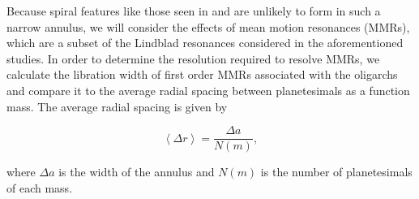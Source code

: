 Because spiral features like those seen in \cite{weinberg07a, weinberg07b} and \cite{cionco02} are unlikely to form in such a 
narrow annulus, we will consider the effects of mean motion resonances (MMRs), which are a subset of the Lindblad resonances 
considered in the aforementioned studies. In order to determine the resolution required to resolve MMRs, we calculate the 
libration width of first order MMRs associated with the oligarchs and compare it to the average radial spacing between 
planetesimals as a function mass. The average radial spacing is given by

\begin{equation}\label{eq:spacing}
\left< \Delta r \right> = \frac{\Delta a}{N(m)},
\end{equation}

\noindent where $\Delta a$ is the width of the annulus and $N(m)$ is the number of planetesimals of each mass.